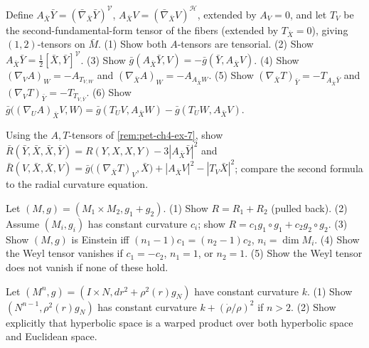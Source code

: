 \begin{remark}
  \label{rem:pet-ch4-ex-7}

  Define $A_{\bar X}\bar Y=(\bar\nabla_{\bar X}\bar Y)^{\mathcal V}$,
  $A_{\bar X}V=(\bar\nabla_{\bar X}V)^{\mathcal H}$, extended by $A_V=0$, and let
  $T_V$ be the second-fundamental-form tensor of the fibers (extended by
  $T_{\bar X}=0$), giving $(1,2)$-tensors on $\bar M$. (1) Show both
  $A$-tensors are tensorial. (2) Show
  $A_{\bar X}\bar Y=\tfrac12[\bar X,\bar Y]^{\mathcal V}$. (3) Show
  $\bar g(A_{\bar X}\bar Y,V)=-\bar g(\bar Y,A_{\bar X}V)$. (4) Show
  $(\nabla_VA)_W=-A_{T_{V,W}}$ and $(\nabla_{\bar X}A)_W=-A_{A_{\bar X}W}$.
  (5) Show $(\nabla_{\bar X}T)_{\bar Y}=-T_{A_{\bar X}\bar Y}$ and
  $(\nabla_VT)_{\bar Y}=-T_{T_{V,\bar Y}}$. (6) Show
  $\bar g\big((\nabla_UA)_{\bar X}V,W\big)=\bar g(T_UV,A_{\bar X}W)-\bar g(T_UW,A_{\bar X}V)$.
\end{remark}

\begin{remark}
  \label{rem:pet-ch4-ex-8}

  Using the $A,T$-tensors of \cref{rem:pet-ch4-ex-7}, show
  $\bar R(\bar Y,\bar X,\bar X,\bar Y)=R(Y,X,X,Y)-3|A_{\bar X}\bar Y|^2$ and
  $\bar R(V,\bar X,\bar X,V)=\bar g\big((\nabla_{\bar X}T)_V,\bar X\big)+|A_{\bar X}V|^2-|T_V\bar X|^2$;
  compare the second formula to the radial curvature equation.
\end{remark}

\begin{remark}
  \label{rem:pet-ch4-ex-9}

  Let $(M,g)=(M_1\times M_2,g_1+g_2)$. (1) Show $R=R_1+R_2$ (pulled back). (2)
  Assume $(M_i,g_i)$ has constant curvature $c_i$; show $R=c_1g_1\circ g_1+c_2g_2\circ g_2$.
  (3) Show $(M,g)$ is Einstein iff $(n_1-1)c_1=(n_2-1)c_2$, $n_i=\dim M_i$. (4)
  Show the Weyl tensor vanishes if $c_1=-c_2$, $n_1=1$, or $n_2=1$. (5) Show
  the Weyl tensor does not vanish if none of these hold.
\end{remark}

\begin{remark}
  \label{rem:pet-ch4-ex-10}

  Let $(M^n,g)=(I\times N,dr^2+\rho^2(r)g_N)$ have constant curvature $k$. (1)
  Show $(N^{n-1},\rho^2(r)g_N)$ has constant curvature $k+(\dot\rho/\rho)^2$ if
  $n>2$. (2) Show explicitly that hyperbolic space is a warped product over
  both hyperbolic space and Euclidean space.
\end{remark}

